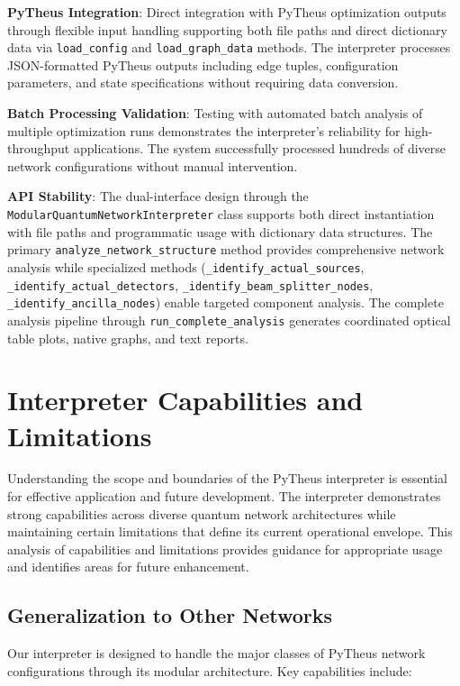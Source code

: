 \documentclass[11pt,a4paper]{article}
\begin{document}
\textbf{PyTheus Integration}: Direct integration with PyTheus optimization outputs through flexible input handling supporting both file paths and direct dictionary data via \texttt{load\_config} and \texttt{load\_graph\_data} methods. The interpreter processes JSON-formatted PyTheus outputs including edge tuples, configuration parameters, and state specifications without requiring data conversion.

\textbf{Batch Processing Validation}: Testing with automated batch analysis of multiple optimization runs demonstrates the interpreter's reliability for high-throughput applications. The system successfully processed hundreds of diverse network configurations without manual intervention.

\textbf{API Stability}: The dual-interface design through the \texttt{ModularQuantumNetworkInterpreter} class supports both direct instantiation with file paths and programmatic usage with dictionary data structures. The primary \texttt{analyze\_network\_structure} method provides comprehensive network analysis while specialized methods (\texttt{\_identify\_actual\_sources}, \texttt{\_identify\_actual\_detectors}, \texttt{\_identify\_beam\_splitter\_nodes}, \texttt{\_identify\_ancilla\_nodes}) enable targeted component analysis. The complete analysis pipeline through \texttt{run\_complete\_analysis} generates coordinated optical table plots, native graphs, and text reports.

\section{Interpreter Capabilities and Limitations}

Understanding the scope and boundaries of the PyTheus interpreter is essential for effective application and future development. The interpreter demonstrates strong capabilities across diverse quantum network architectures while maintaining certain limitations that define its current operational envelope. This analysis of capabilities and limitations provides guidance for appropriate usage and identifies areas for future enhancement.

\subsection{Generalization to Other Networks}

Our interpreter is designed to handle the major classes of PyTheus network configurations through its modular architecture. Key capabilities include:
\end{document}
